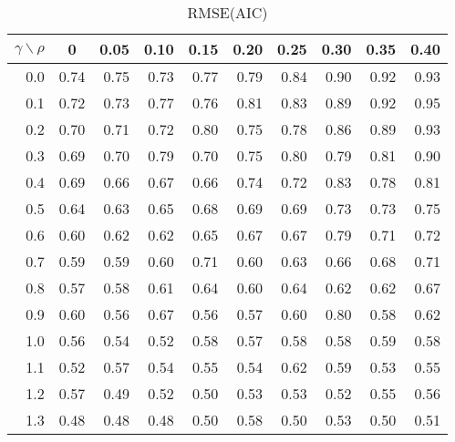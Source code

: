 \documentclass[12pt]{article}
\begin{document}
%
\begin{table}[!tbp]
\caption{RMSE(AIC)}
 \begin{center}
 \begin{tabular}{r|rrrrrrrrr}\hline\hline
\multicolumn{1}{c|}{$\gamma\backslash\rho$}&\multicolumn{1}{c}{0}&\multicolumn{1}{c}{0.05}&\multicolumn{1}{c}{0.10}&\multicolumn{1}{c}{0.15}&\multicolumn{1}{c}{0.20}&\multicolumn{1}{c}{0.25}&\multicolumn{1}{c}{0.30}&\multicolumn{1}{c}{0.35}&\multicolumn{1}{c}{0.40}\tabularnewline
\hline

0.0&0.74&0.75&0.73&0.77&0.79&0.84&0.90&0.92&0.93\tabularnewline
0.1&0.72&0.73&0.77&0.76&0.81&0.83&0.89&0.92&0.95\tabularnewline
0.2&0.70&0.71&0.72&0.80&0.75&0.78&0.86&0.89&0.93\tabularnewline
0.3&0.69&0.70&0.79&0.70&0.75&0.80&0.79&0.81&0.90\tabularnewline
0.4&0.69&0.66&0.67&0.66&0.74&0.72&0.83&0.78&0.81\tabularnewline
0.5&0.64&0.63&0.65&0.68&0.69&0.69&0.73&0.73&0.75\tabularnewline
0.6&0.60&0.62&0.62&0.65&0.67&0.67&0.79&0.71&0.72\tabularnewline
0.7&0.59&0.59&0.60&0.71&0.60&0.63&0.66&0.68&0.71\tabularnewline
0.8&0.57&0.58&0.61&0.64&0.60&0.64&0.62&0.62&0.67\tabularnewline
0.9&0.60&0.56&0.67&0.56&0.57&0.60&0.80&0.58&0.62\tabularnewline
1.0&0.56&0.54&0.52&0.58&0.57&0.58&0.58&0.59&0.58\tabularnewline
1.1&0.52&0.57&0.54&0.55&0.54&0.62&0.59&0.53&0.55\tabularnewline
1.2&0.57&0.49&0.52&0.50&0.53&0.53&0.52&0.55&0.56\tabularnewline
1.3&0.48&0.48&0.48&0.50&0.58&0.50&0.53&0.50&0.51\tabularnewline
\hline
\end{tabular}

\end{center}

\end{table}
\end{document}
